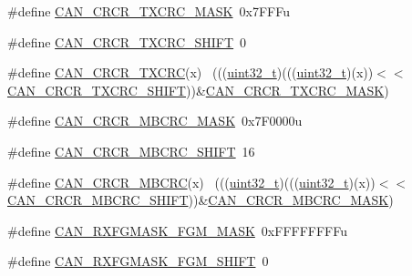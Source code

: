 \begin{DoxyCompactItemize}
\item 
\#define \hyperlink{group___c_a_n___register___masks_ga84c305cf0ec60d0624b454e280c69c4b}{C\+A\+N\+\_\+\+C\+R\+C\+R\+\_\+\+T\+X\+C\+R\+C\+\_\+\+M\+A\+SK}~0x7\+F\+F\+Fu
\item 
\#define \hyperlink{group___c_a_n___register___masks_ga56fca714ec47e9786fdf7e9378c660aa}{C\+A\+N\+\_\+\+C\+R\+C\+R\+\_\+\+T\+X\+C\+R\+C\+\_\+\+S\+H\+I\+FT}~0
\item 
\#define \hyperlink{group___c_a_n___register___masks_ga0349217f6b6cb17e679907753cb1b580}{C\+A\+N\+\_\+\+C\+R\+C\+R\+\_\+\+T\+X\+C\+RC}(x)                                            ~(((\hyperlink{_p_e___types_8h_a33594304e786b158f3fb30289278f5af}{uint32\+\_\+t})(((\hyperlink{_p_e___types_8h_a33594304e786b158f3fb30289278f5af}{uint32\+\_\+t})(x))$<$$<$\hyperlink{group___c_a_n___register___masks_ga56fca714ec47e9786fdf7e9378c660aa}{C\+A\+N\+\_\+\+C\+R\+C\+R\+\_\+\+T\+X\+C\+R\+C\+\_\+\+S\+H\+I\+FT}))\&\hyperlink{group___c_a_n___register___masks_ga84c305cf0ec60d0624b454e280c69c4b}{C\+A\+N\+\_\+\+C\+R\+C\+R\+\_\+\+T\+X\+C\+R\+C\+\_\+\+M\+A\+SK})
\item 
\#define \hyperlink{group___c_a_n___register___masks_ga8b17ddaa608ead97f25b59e5919d079c}{C\+A\+N\+\_\+\+C\+R\+C\+R\+\_\+\+M\+B\+C\+R\+C\+\_\+\+M\+A\+SK}~0x7\+F0000u
\item 
\#define \hyperlink{group___c_a_n___register___masks_ga1d18c789e52dbae45dc581a3327a1bde}{C\+A\+N\+\_\+\+C\+R\+C\+R\+\_\+\+M\+B\+C\+R\+C\+\_\+\+S\+H\+I\+FT}~16
\item 
\#define \hyperlink{group___c_a_n___register___masks_gadf313688a0803a57a7daa1f21876c6c7}{C\+A\+N\+\_\+\+C\+R\+C\+R\+\_\+\+M\+B\+C\+RC}(x)                                            ~(((\hyperlink{_p_e___types_8h_a33594304e786b158f3fb30289278f5af}{uint32\+\_\+t})(((\hyperlink{_p_e___types_8h_a33594304e786b158f3fb30289278f5af}{uint32\+\_\+t})(x))$<$$<$\hyperlink{group___c_a_n___register___masks_ga1d18c789e52dbae45dc581a3327a1bde}{C\+A\+N\+\_\+\+C\+R\+C\+R\+\_\+\+M\+B\+C\+R\+C\+\_\+\+S\+H\+I\+FT}))\&\hyperlink{group___c_a_n___register___masks_ga8b17ddaa608ead97f25b59e5919d079c}{C\+A\+N\+\_\+\+C\+R\+C\+R\+\_\+\+M\+B\+C\+R\+C\+\_\+\+M\+A\+SK})
\item 
\#define \hyperlink{group___c_a_n___register___masks_ga5db0253c73d24a846f3f3ce6cd67e74c}{C\+A\+N\+\_\+\+R\+X\+F\+G\+M\+A\+S\+K\+\_\+\+F\+G\+M\+\_\+\+M\+A\+SK}~0x\+F\+F\+F\+F\+F\+F\+F\+Fu
\item 
\#define \hyperlink{group___c_a_n___register___masks_ga65e590b20d692e367f4ee9dc8a4585e2}{C\+A\+N\+\_\+\+R\+X\+F\+G\+M\+A\+S\+K\+\_\+\+F\+G\+M\+\_\+\+S\+H\+I\+FT}~0

\end{DoxyCompactItemize}
